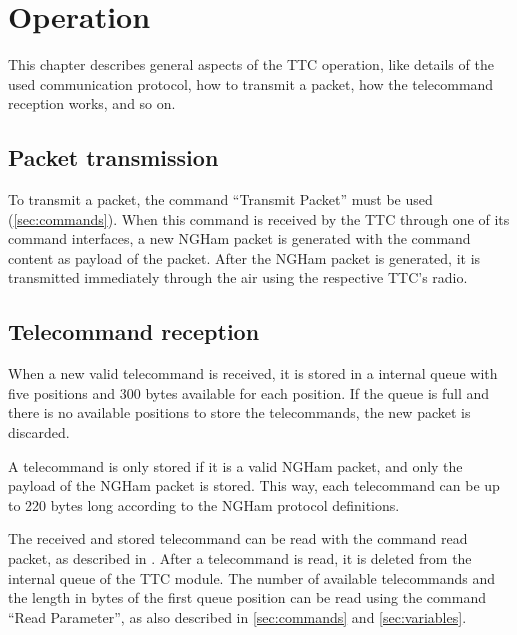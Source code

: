 %
%
%
%
%

%
%
%
%
%


\chapter{Operation} \label{ch:operation}

This chapter describes general aspects of the TTC operation, like details of the used communication protocol, how to transmit a packet, how the telecommand reception works, and so on.

\section{Packet transmission}

To transmit a packet, the command ``Transmit Packet'' must be used (\autoref{sec:commands}). When this command is received by the TTC through one of its command interfaces, a new NGHam packet is generated with the command content as payload of the packet. After the NGHam packet is generated, it is transmitted immediately through the air using the respective TTC's radio.

\section{Telecommand reception}

When a new valid telecommand is received, it is stored in a internal queue with five positions and 300 bytes available for each position. If the queue is full and there is no available positions to store the telecommands, the new packet is discarded.

A telecommand is only stored if it is a valid NGHam packet, and only the payload of the NGHam packet is stored. This way, each telecommand can be up to 220 bytes long according to the NGHam protocol definitions.

The received and stored telecommand can be read with the command read packet, as described in . After a telecommand is read, it is deleted from the internal queue of the TTC module. The number of available telecommands and the length in bytes of the first queue position can be read using the command ``Read Parameter'', as also described in \autoref{sec:commands} and \ref{sec:variables}.


